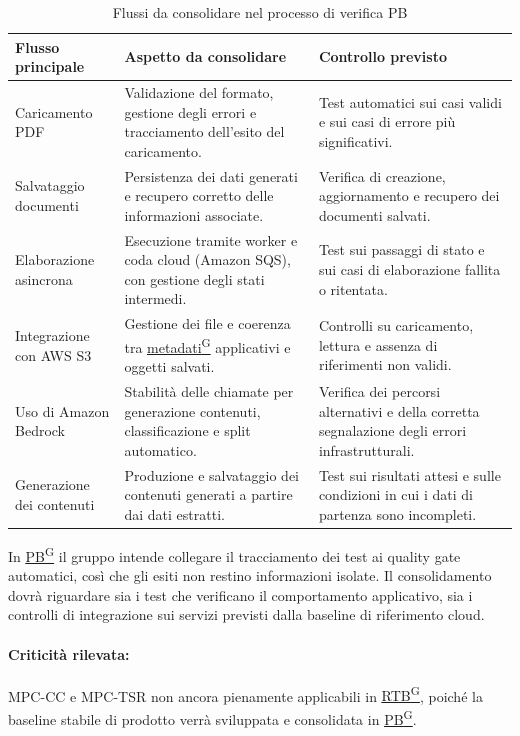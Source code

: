 \documentclass[a4paper,12pt]{article}
\providecommand{\glslink}[2]{\href{https://alittlebyte-19.github.io/Documentazione/glossario.html\#gls-#1}{\underline{#2}\textsuperscript{\scriptsize G}}}
\begin{document}
\begin{table}[H]
    \centering
    \renewcommand{\arraystretch}{1.25}
    \begin{tabularx}{\textwidth}{|p{3.3cm}|X|X|}
        \hline
        \rowcolor{gray!35}
        \textbf{Flusso principale} & \textbf{Aspetto da consolidare} & \textbf{Controllo previsto} \\
        \hline
        Caricamento PDF & Validazione del formato, gestione degli errori e tracciamento dell'esito del caricamento. & Test automatici sui casi validi e sui casi di errore più significativi. \\
        \hline
        Salvataggio documenti & Persistenza dei dati generati e recupero corretto delle informazioni associate. & Verifica di creazione, aggiornamento e recupero dei documenti salvati. \\
        \hline
        Elaborazione asincrona & Esecuzione tramite worker e coda cloud (Amazon SQS), con gestione degli stati intermedi. & Test sui passaggi di stato e sui casi di elaborazione fallita o ritentata. \\
        \hline
        Integrazione con AWS S3 & Gestione dei file e coerenza tra \glslink{metadati}{metadati} applicativi e oggetti salvati. & Controlli su caricamento, lettura e assenza di riferimenti non validi. \\
        \hline
        Uso di Amazon Bedrock & Stabilità delle chiamate per generazione contenuti, classificazione e split automatico. & Verifica dei percorsi alternativi e della corretta segnalazione degli errori infrastrutturali. \\
        \hline
        Generazione dei contenuti & Produzione e salvataggio dei contenuti generati a partire dai dati estratti. & Test sui risultati attesi e sulle condizioni in cui i dati di partenza sono incompleti. \\
        \hline
    \end{tabularx}
    \caption{Flussi da consolidare nel processo di verifica PB}
\end{table}

In \glslink{pb-product-baseline}{PB} il gruppo intende collegare il tracciamento dei test ai quality gate automatici, così che gli esiti non restino informazioni isolate. Il consolidamento dovrà riguardare sia i test che verificano il comportamento applicativo, sia i controlli di integrazione sui servizi previsti dalla baseline di riferimento cloud.

\paragraph*{Criticità rilevata:} MPC-CC e MPC-TSR non ancora pienamente applicabili in \glslink{rtb-requirements-and-technology-baseline}{RTB}, poiché la baseline stabile di prodotto verrà sviluppata e consolidata in \glslink{pb-product-baseline}{PB}.
\end{document}

